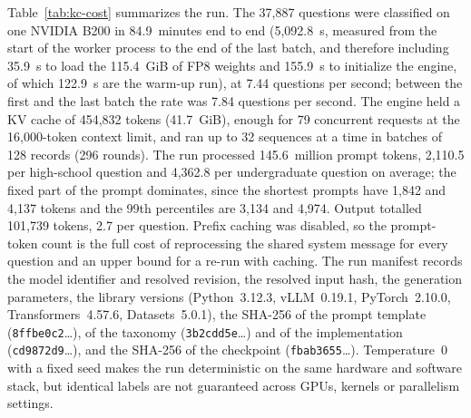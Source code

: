 Table~\ref{tab:kc-cost} summarizes the run. The 37,887 questions were
classified on one NVIDIA B200 in 84.9~minutes end to end (5,092.8~s,
measured from the start of the worker process to the end of the last batch,
and therefore including 35.9~s to load the 115.4~GiB of FP8 weights and
155.9~s to initialize the engine, of which 122.9~s are the warm-up run), at
7.44 questions per second; between the first and the last batch the rate was
7.84 questions per second. The engine held a KV cache of 454,832 tokens
(41.7~GiB), enough for 79 concurrent requests at the 16,000-token context
limit, and ran up to 32 sequences at a time in batches of 128 records (296
rounds). The run processed 145.6~million prompt tokens, 2,110.5 per
high-school question and 4,362.8 per undergraduate question on average; the
fixed part of the prompt dominates, since the shortest prompts have 1,842 and
4,137 tokens and the 99th percentiles are 3,134 and 4,974. Output totalled
101,739 tokens, 2.7 per question. Prefix caching was disabled, so the
prompt-token count is the full cost of reprocessing the shared system message
for every question and an upper bound for a re-run with caching. The run
manifest records the model identifier and resolved revision, the resolved
input hash, the generation parameters, the library versions (Python~3.12.3,
vLLM~0.19.1, PyTorch~2.10.0, Transformers~4.57.6, Datasets~5.0.1), the SHA-256
of the prompt template (\texttt{8ffbe0c2}\ldots), of the taxonomy
(\texttt{3b2cdd5e}\ldots) and of the implementation (\texttt{cd9872d9}\ldots),
and the SHA-256 of the checkpoint (\texttt{fbab3655}\ldots). Temperature~0
with a fixed seed makes the run deterministic on the same hardware and
software stack, but identical labels are not guaranteed across GPUs, kernels
or parallelism settings.

